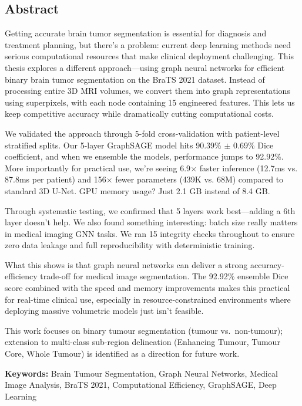 \begin{center}
    \section*{Abstract}
\end{center}

Getting accurate brain tumor segmentation is essential for diagnosis and treatment planning, but there's a problem: current deep learning methods need serious computational resources that make clinical deployment challenging. This thesis explores a different approach—using graph neural networks for efficient binary brain tumor segmentation on the BraTS 2021 dataset. Instead of processing entire 3D MRI volumes, we convert them into graph representations using superpixels, with each node containing 15 engineered features. This lets us keep competitive accuracy while dramatically cutting computational costs.

We validated the approach through 5-fold cross-validation with patient-level stratified splits. Our 5-layer GraphSAGE model hits 90.39\% $\pm$ 0.69\% Dice coefficient, and when we ensemble the models, performance jumps to 92.92\%. More importantly for practical use, we're seeing 6.9$\times$ faster inference (12.7ms vs. 87.8ms per patient) and 156$\times$ fewer parameters (439K vs. 68M) compared to standard 3D U-Net. GPU memory usage? Just 2.1 GB instead of 8.4 GB.

Through systematic testing, we confirmed that 5 layers work best—adding a 6th layer doesn't help. We also found something interesting: batch size really matters in medical imaging GNN tasks. We ran 15 integrity checks throughout to ensure zero data leakage and full reproducibility with deterministic training.

What this shows is that graph neural networks can deliver a strong accuracy-efficiency trade-off for medical image segmentation. The 92.92\% ensemble Dice score combined with the speed and memory improvements makes this practical for real-time clinical use, especially in resource-constrained environments where deploying massive volumetric models just isn't feasible.

This work focuses on binary tumour segmentation (tumour vs.\ non-tumour); extension to multi-class sub-region delineation (Enhancing Tumour, Tumour Core, Whole Tumour) is identified as a direction for future work.

\textbf{Keywords:} Brain Tumour Segmentation, Graph Neural Networks, Medical Image Analysis, BraTS 2021, Computational Efficiency, GraphSAGE, Deep Learning